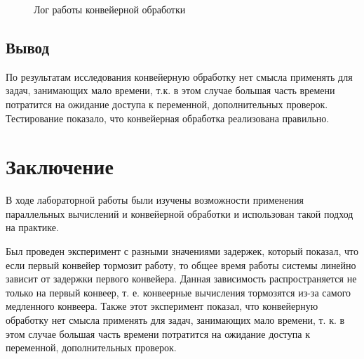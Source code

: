 \documentclass[12pt]{report}
\begin{document}
\begin{figure}[H]
	\caption{Лог работы конвейерной обработки}
	\label{fig:v_st}
\end{figure}



\section*{Вывод}
По результатам исследования конвейерную обработку нет смысла применять для задач, занимающих мало времени, т.к. в этом случае большая часть времени потратится на ожидание доступа к переменной, дополнительных проверок.
Тестирование показало, что конвейерная обработка реализована правильно.

\chapter*{Заключение}
В ходе лабораторной работы были изучены возможности применения параллельных вычислений и конвейерной обработки и использован такой подход на практике. 

Был проведен эксперимент с разными значениями задержек, который показал, что если первый конвейер тормозит работу, то общее время работы системы линейно зависит от задержки первого конвейера. Данная зависимость распространяется не только на первый конвеер, т. е. конвеерные вычисления тормозятся из-за самого медленного конвеера. Также этот эксперимент показал, что конвейерную обработку нет смысла применять для задач, занимающих мало времени, т. к. в этом случае большая часть времени потратится на ожидание доступа к переменной, дополнительных проверок.
\end{document}
